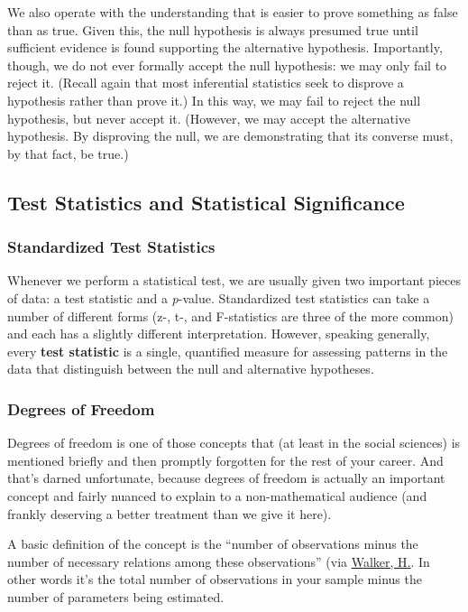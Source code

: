 We also operate with the understanding that is easier to prove something as false than as true. Given this, the null hypothesis is always presumed true until sufficient evidence is found supporting the alternative hypothesis. Importantly, though, we do not ever formally accept the null hypothesis: we may only fail to reject it. (Recall again that most inferential statistics seek to disprove a hypothesis rather than prove it.) In this way, we may fail to reject the null hypothesis, but never accept it. (However, we may accept the alternative hypothesis. By disproving the null, we are demonstrating that its converse must, by that fact, be true.)

\subsection{Test Statistics and Statistical Significance}

\subsubsection{Standardized Test Statistics}
Whenever we perform a statistical test, we are usually given two important pieces of data: a test statistic and a \textit{p}-value. Standardized test statistics can take a number of different forms (z-, t-, and F-statistics are three of the more common) and each has a slightly different interpretation. However, speaking generally, every \textbf{test statistic} is a single, quantified measure for assessing patterns in the data that distinguish between the null and alternative hypotheses.

\subsubsection{Degrees of Freedom}

Degrees of freedom is one of those concepts that (at least in the social sciences) is mentioned briefly and then promptly forgotten for the rest of your career. And that's darned unfortunate, because degrees of freedom is actually an important concept and fairly nuanced to explain to a non-mathematical audience (and frankly deserving a better treatment than we give it here).

A basic definition of the concept is the ``number of observations minus the number of necessary relations among these observations'' (via \href{http://dx.doi.org/10.1037%2Fh0054588}{Walker, H.}. In other words it's the total number of observations in your sample minus the number of parameters being estimated.

